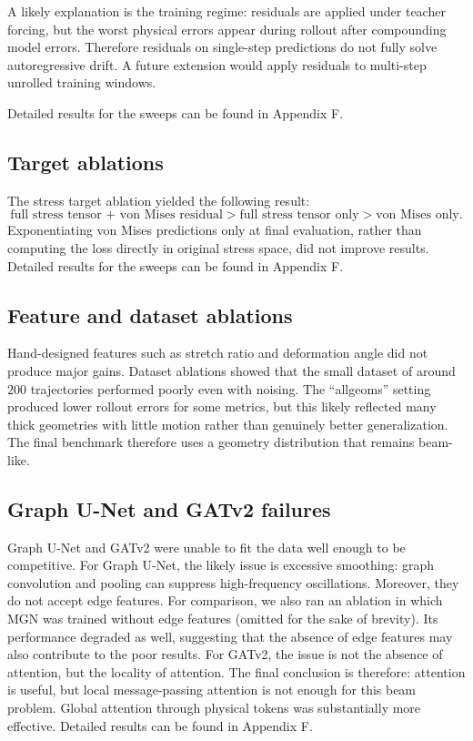 \documentclass[11pt,a4paper,reqno]{amsart}
\theoremstyle{definition}
\theoremstyle{remark}
\numberwithin{equation}{section}
\begin{document}
A likely explanation is the training regime: residuals are applied under teacher forcing, but the worst physical errors appear during rollout after compounding model errors. Therefore residuals on single-step predictions do not fully solve autoregressive drift. A future extension would apply residuals to multi-step unrolled training windows. 

Detailed results for the sweeps can be found in Appendix F.

\subsection{Target ablations}

The stress target ablation yielded the following result:
\begin{equation}
    \text{full stress tensor + von Mises residual} > \text{full stress tensor only} > \text{von Mises only}.
\end{equation}
Exponentiating von Mises predictions only at final evaluation, rather than computing the loss directly in original stress space, did not improve results. 
Detailed results for the sweeps can be found in Appendix F.

\subsection{Feature and dataset ablations}

Hand-designed features such as stretch ratio and deformation angle did not produce major gains. 
Dataset ablations showed that the small dataset of around $200$ trajectories performed poorly even with noising. The ``allgeoms'' setting produced lower rollout errors for some metrics, but this likely reflected many thick geometries with little motion rather than genuinely better generalization. The final benchmark therefore uses a geometry distribution that remains beam-like.

\subsection{Graph U-Net and GATv2 failures}

Graph U-Net and GATv2 were unable to fit the data well enough to be competitive. For Graph U-Net, the likely issue is excessive smoothing: graph convolution and pooling can suppress high-frequency oscillations. Moreover, they do not accept edge features. For comparison, we also ran an ablation in which MGN was trained without edge features (omitted for the sake of brevity). Its performance degraded as well, suggesting that the absence of edge features may also contribute to the poor results. For GATv2, the issue is not the absence of attention, but the locality of attention. The final conclusion is therefore: attention is useful, but local message-passing attention is not enough for this beam problem. Global attention through physical tokens was substantially more effective. Detailed results can be found in Appendix F.
\end{document}
